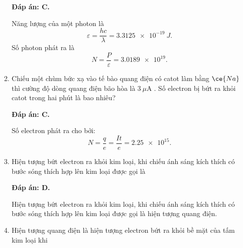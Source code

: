 \begin{enumerate}[label=\bfseries Câu \arabic*:]
	\loigiai
	{		\textbf{Đáp án: C.}

Năng lượng của một photon là
$$
	\varepsilon = \dfrac{hc}{\lambda} = \SI{3,3125 e-19}{J}.
$$		
Số photon phát ra là
$$
	N = \dfrac{P}{\varepsilon} = \num{3,0189 e19}.
$$
		
	}
	
	\item {} 
		\cauhoi
	{Chiếu một chùm bức xạ vào tế bào quang điện có catot làm bằng $\ce{Na}$ thì cường độ dòng quang điện bão hòa là $3\ \mu\text{A}$ . Số electron bị bứt ra khỏi catot trong hai phút là bao nhiêu?
	}
	
	\loigiai
	{		\textbf{Đáp án: C.}
		
Số electron phát ra cho bởi:
$$
	N = \dfrac{q}{e} = \dfrac{It}{e} = \num{2,25 e15}.
$$
		
	}
	
\item {} 
		\cauhoi
	{Hiện tượng bứt electron ra khỏi kim loại, khi chiếu ánh sáng kích thích có bước sóng thích hợp lên kim loại được gọi là
	}
	
	\loigiai
	{		\textbf{Đáp án: D.}
		
Hiện tượng bứt electron ra khỏi kim loại, khi chiếu ánh sáng kích thích có bước sóng thích hợp lên kim loại được gọi là hiện tượng quang điện. 
		
	}
	
	\item {} 
		\cauhoi
	{Hiện tượng quang điện là hiện tượng electron bứt ra khỏi bề mặt của tấm kim loại khi 
	}
	

\end{enumerate}
